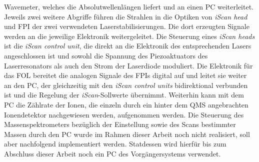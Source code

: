 Wavemeter, welches die Absolutwellenlängen liefert und an einen PC weiterleitet.
Jeweils zwei weitere Abgriffe führen die Strahlen in die Optiken von
\textit{iScan head} und FPI der zwei verwendeten Laserstabilisierungen. Die dort erzeugten
Signale werden an die jeweilige Elektronik weitergeleitet. Die Steuerung eines
\textit{iScan heads} ist die \textit{iScan control unit}, die direkt an die
Elektronik des entsprechenden Lasers angeschlossen ist und sowohl die Spannung
des Piezoaktuators des Laserresonators als auch den Strom der Laserdiode
moduliert.
Die Elektronik für das FOL bereitet die analogen Signale des FPIs digital auf und
leitet sie weiter an den PC, der gleichzeitig mit den \textit{iScan control units} bidirektional
verbunden ist und die Regelung der \textit{iScan}-Sollwerte übernimmt. Weiterhin
kann mit dem PC die Zählrate der Ionen, die einzeln durch ein hinter dem QMS
angebrachten Ionendetektor nachgewiesen werden, aufgenommen werden. Die
Steuerung des Massenspektrometers bezüglich der Einstellung sowie des Scans
bestimmter Massen durch den PC wurde im Rahmen dieser Arbeit noch nicht realisiert, soll aber
nachfolgend implementiert werden. Statdessen wird hierfür bis zum Abschluss
dieser Arbeit noch ein PC des Vorgängersystems verwendet.

